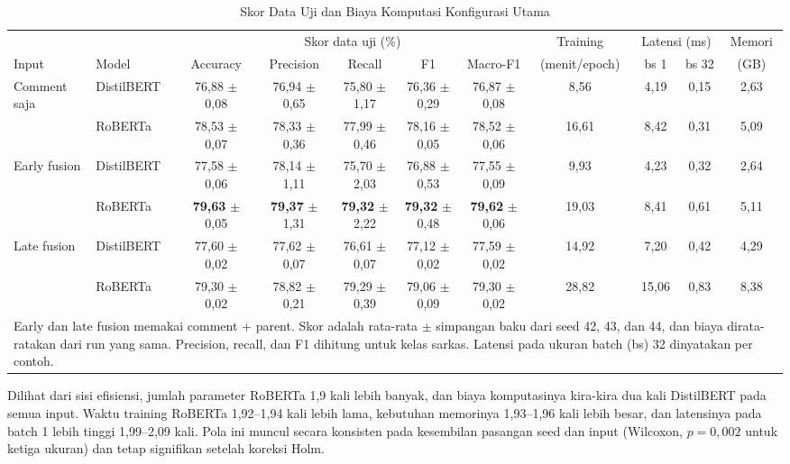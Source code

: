 \documentclass[conference]{IEEEtran}
\begin{document}
\begin{table}[t]
\caption{Skor Data Uji dan Biaya Komputasi Konfigurasi Utama}
\label{tab:main}
\centering
\footnotesize
\setlength{\tabcolsep}{3pt}
\begin{tabular}{llccccccccc}
\hline
 & & \multicolumn{5}{c}{Skor data uji (\%)} & Training & \multicolumn{2}{c}{Latensi (ms)} & Memori \\
Input & Model & Accuracy & Precision & Recall & F1 & Macro-F1 & (menit/epoch) & bs 1 & bs 32 & (GB) \\
\hline
Comment saja & DistilBERT & 76,88 $\pm$ 0,08 & 76,94 $\pm$ 0,65 & 75,80 $\pm$ 1,17 & 76,36 $\pm$ 0,29 & 76,87 $\pm$ 0,08 & 8,56 & 4,19 & 0,15 & 2,63 \\
 & RoBERTa & 78,53 $\pm$ 0,07 & 78,33 $\pm$ 0,36 & 77,99 $\pm$ 0,46 & 78,16 $\pm$ 0,05 & 78,52 $\pm$ 0,06 & 16,61 & 8,42 & 0,31 & 5,09 \\
Early fusion & DistilBERT & 77,58 $\pm$ 0,06 & 78,14 $\pm$ 1,11 & 75,70 $\pm$ 2,03 & 76,88 $\pm$ 0,53 & 77,55 $\pm$ 0,09 & 9,93 & 4,23 & 0,32 & 2,64 \\
 & RoBERTa & \textbf{79,63} $\pm$ 0,05 & \textbf{79,37} $\pm$ 1,31 & \textbf{79,32} $\pm$ 2,22 & \textbf{79,32} $\pm$ 0,48 & \textbf{79,62} $\pm$ 0,06 & 19,03 & 8,41 & 0,61 & 5,11 \\
Late fusion & DistilBERT & 77,60 $\pm$ 0,02 & 77,62 $\pm$ 0,07 & 76,61 $\pm$ 0,07 & 77,12 $\pm$ 0,02 & 77,59 $\pm$ 0,02 & 14,92 & 7,20 & 0,42 & 4,29 \\
 & RoBERTa & 79,30 $\pm$ 0,02 & 78,82 $\pm$ 0,21 & 79,29 $\pm$ 0,39 & 79,06 $\pm$ 0,09 & 79,30 $\pm$ 0,02 & 28,82 & 15,06 & 0,83 & 8,38 \\
\hline
\multicolumn{11}{p{0.97\textwidth}}{Early dan late fusion memakai comment + parent. Skor adalah rata-rata $\pm$ simpangan baku dari seed 42, 43, dan 44, dan biaya dirata-ratakan dari run yang sama. Precision, recall, dan F1 dihitung untuk kelas sarkas. Latensi pada ukuran batch (bs) 32 dinyatakan per contoh.}
\end{tabular}
\end{table}

Dilihat dari sisi efisiensi, jumlah parameter RoBERTa 1,9 kali lebih banyak, dan biaya komputasinya kira-kira dua kali DistilBERT pada semua input. Waktu training RoBERTa 1,92--1,94 kali lebih lama, kebutuhan memorinya 1,93--1,96 kali lebih besar, dan latensinya pada batch 1 lebih tinggi 1,99--2,09 kali. Pola ini muncul secara konsisten pada kesembilan pasangan seed dan input (Wilcoxon, $p = 0{,}002$ untuk ketiga ukuran) dan tetap signifikan setelah koreksi Holm.
\end{document}
